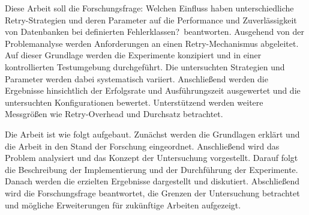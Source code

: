 Diese Arbeit soll die Forschungsfrage: \glqq Welchen Einfluss haben unterschiedliche Retry-Strategien und deren
Parameter auf die Performance und Zuverlässigkeit von Datenbanken bei definierten Fehlerklassen?\grqq \ beantworten.
Ausgehend von der Problemanalyse werden Anforderungen an einen
Retry-Mechanismus abgeleitet.
Auf dieser Grundlage werden die Experimente konzipiert und in einer kontrollierten Testumgebung durchgeführt.
Die untersuchten Strategien und Parameter werden dabei systematisch variiert.
Anschließend werden die Ergebnisse hinsichtlich der Erfolgsrate und Ausführungszeit ausgewertet und die untersuchten
Konfigurationen bewertet.
Unterstützend werden weitere Messgrößen wie Retry-Overhead und Durchsatz betrachtet.

Die Arbeit ist wie folgt aufgebaut.
Zunächst werden die Grundlagen erklärt und die Arbeit in den Stand der Forschung eingeordnet.
Anschließend wird das Problem analysiert und das Konzept der Untersuchung vorgestellt.
Darauf folgt die Beschreibung der Implementierung und der Durchführung der Experimente.
Danach werden die erzielten Ergebnisse dargestellt und diskutiert.
Abschließend wird die Forschungsfrage beantwortet, die Grenzen der Untersuchung betrachtet und mögliche
Erweiterungen für zukünftige Arbeiten
aufgezeigt.